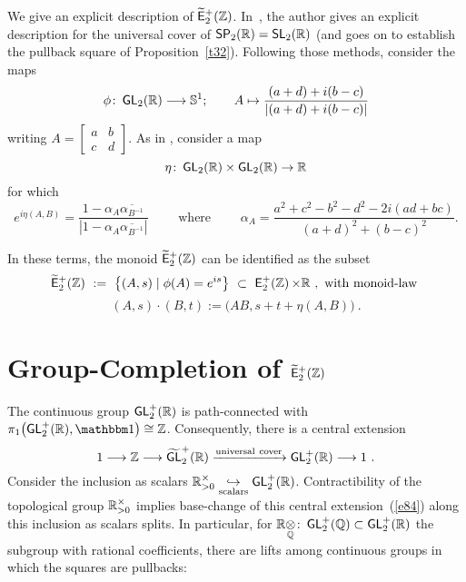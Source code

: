 \begin{remark}
We give an explicit description of $\operatorname{\widetilde{\sf E}_{2}^{+}(\mathbb Z)}$.
In~\cite{rawn}, the author gives an explicit description for the universal cover of $\operatorname{\sf SP}_{2}(\mathbb R) = \operatorname{\sf SL}_{2}(\mathbb R)$ (and goes on to establish the pullback square of Proposition~\ref{t32}).
Following those methods, consider the maps
\[
\phi
\colon
\operatorname{\sf GL}_2(\mathbb R)
\longrightarrow
\mathbb S^1;
\qquad
 A
\mapsto \frac{(a + d) + i(b - c)}{|(a + d) + i(b - c)|}
\]
writing
$
A =
\begin{bmatrix}
a & b 
\\
c & d
\end{bmatrix}.
$
As in \cite{rawn}, consider a map
\[
\eta \colon \operatorname{\sf GL}_2(\mathbb R) \times \operatorname{\sf GL}_2(\mathbb R) \rightarrow \mathbb R
\]
for which
\[
e^{i\eta(A, B)} = \frac{1 - \alpha_{A}\overline{\alpha_{B^{-1}}}}{|1 - \alpha_{A}\overline{\alpha_{B^{-1}}}|}
\qquad
\text{ where }
\qquad
\alpha_{A} = \frac{a^{2} + c^{2} - b^{2} - d^{2} - 2i(ad + bc)}{(a + d)^{2} + (b - c)^{2}}.
\]



In these terms, the monoid $\operatorname{\widetilde{\sf E}_{2}^{+}(\mathbb Z)}$ can be identified as the subset
\[
\operatorname{\widetilde{\sf E}_{2}^{+}(\mathbb Z)}
~:=~
\bigl\{
(A, s)  \mid  \phi(A) = e^{is}
\bigr\} 
~\subset~
\operatorname{\mathsf E^+_2(\mathbb Z)} \times \mathbb R
~,~
\text{with monoid-law }
\]
\[
(A, s) \cdot (B, t) := \bigl(AB, s + t + \eta(A, B) \bigr)
~.
\]
\end{remark}





\section{Group-Completion of $\operatorname{\widetilde{\sf E}_{2}^{+}(\mathbb Z)}$}



The continuous group $\operatorname{\sf GL}_2^+(\mathbb R)$ is path-connected with $\pi_1\bigl( \GL_2^+(\RR) , \uno \bigr) \cong \ZZ$.
Consequently, there is a central extension
\begin{equation}
\label{e84}
1
\longrightarrow
\mathbb Z
\longrightarrow
\widetilde{\operatorname{\sf GL}}_2^+(\mathbb R)
\xrightarrow{\rm universal~cover}
\operatorname{\sf GL}_2^+(\mathbb R)
\longrightarrow
1
~.
\end{equation}
Consider the inclusion as scalars $\mathbb R_{>0}^\times \underset{\rm scalars} \hookrightarrow \operatorname{\sf GL}_2^+(\mathbb R)$.
Contractibility of the topological group $\mathbb R_{>0}^\times$ implies base-change of this central extension~(\ref{e84}) along this inclusion as scalars splits.
In particular, 
for $\mathbb R\underset{\mathbb Q}{\otimes} \colon \operatorname{\sf GL}_2^+(\mathbb Q)\subset \operatorname{\sf GL}_2^+(\mathbb R)$ the subgroup with rational coefficients, 
there are lifts among continuous groups in which the squares are pullbacks:

